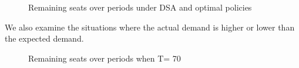 \newpage

\begin{figure}[h]
  \centering
  \caption{Remaining seats over periods under DSA and optimal policies}
\end{figure}

We also examine the situations where the actual demand is higher or lower than the expected demand.

\begin{figure}[h]
  \centering
  \caption{Remaining seats over periods when T= 70}
\end{figure}


